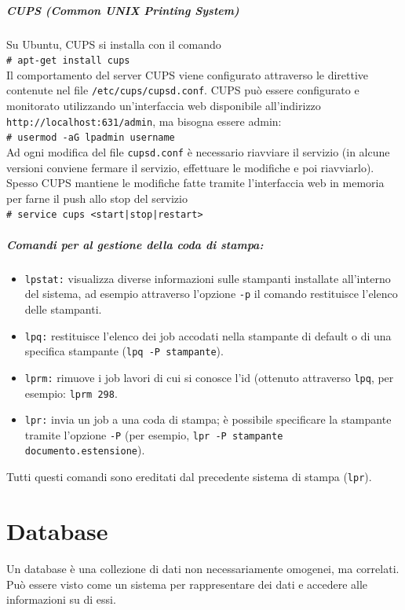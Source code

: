 \documentclass[a4paper]{report}
\newcommand\tab[1][1cm]{\hspace*{#1}}
\begin{document}
\paragraph{CUPS (Common UNIX Printing System)} Su Ubuntu, CUPS si installa con il comando\\\tab\texttt{\# apt-get install cups}\\
Il comportamento del server CUPS viene configurato attraverso le direttive contenute nel file \texttt{/etc/cups/cupsd.conf}. CUPS può essere configurato e monitorato utilizzando un'interfaccia web disponibile all'indirizzo \texttt{http://localhost:631/admin}, ma bisogna essere admin:\\
\tab\texttt{\# usermod -aG lpadmin username}\\
Ad ogni modifica del file \texttt{cupsd.conf} è necessario riavviare il servizio (in alcune versioni conviene fermare il servizio, effettuare le modifiche e poi riavviarlo). Spesso CUPS mantiene le modifiche fatte tramite l'interfaccia web in memoria per farne il push allo stop del servizio\\
\tab\texttt{\# service cups <start|stop|restart>}\\
\paragraph{Comandi per al gestione della coda di stampa:}
\begin{itemize}
\item \texttt{lpstat:} visualizza diverse informazioni sulle stampanti installate all'interno del sistema, ad esempio attraverso l'opzione \texttt{-p} il comando restituisce l'elenco delle stampanti.
\item \texttt{lpq:} restituisce l'elenco dei job accodati nella stampante di default o di una specifica stampante (\texttt{lpq -P stampante}).
\item \texttt{lprm:} rimuove i job lavori di cui si conosce l'id (ottenuto attraverso \texttt{lpq}, per esempio: \texttt{lprm 298}.
\item \texttt{lpr:} invia un job a una coda di stampa; è possibile specificare la stampante tramite l'opzione \texttt{-P} (per esempio, \texttt{lpr -P stampante documento.estensione}).
\end{itemize}
Tutti questi comandi sono ereditati dal precedente sistema di stampa (\texttt{lpr}).\\
\chapter{Database}
Un database è una collezione di dati non necessariamente omogenei, ma correlati. Può essere visto come un sistema per rappresentare dei dati e accedere alle informazioni su di essi.\\
\end{document}
